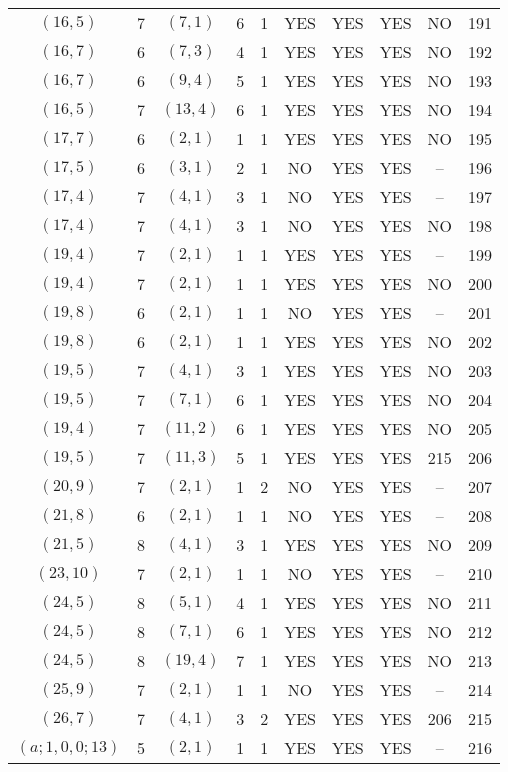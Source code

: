 \begin{longtable}{|c|c|c|c|c|c|c|c|c|c|}
$(16, 5)$ & 7 & $(7, 1)$ & 6 & 1 & YES & YES & YES & NO & 191\\
$(16, 7)$ & 6 & $(7, 3)$ & 4 & 1 & YES & YES & YES & NO & 192\\
$(16, 7)$ & 6 & $(9, 4)$ & 5 & 1 & YES & YES & YES & NO & 193\\
$(16, 5)$ & 7 & $(13, 4)$ & 6 & 1 & YES & YES & YES & NO & 194\\
$(17, 7)$ & 6 & $(2, 1)$ & 1 & 1 & YES & YES & YES & NO & 195\\
$(17, 5)$ & 6 & $(3, 1)$ & 2 & 1 & NO & YES & YES & -- & 196\\
$(17, 4)$ & 7 & $(4, 1)$ & 3 & 1 & NO & YES & YES & -- & 197\\
$(17, 4)$ & 7 & $(4, 1)$ & 3 & 1 & NO & YES & YES & NO & 198\\
$(19, 4)$ & 7 & $(2, 1)$ & 1 & 1 & YES & YES & YES & -- & 199\\
$(19, 4)$ & 7 & $(2, 1)$ & 1 & 1 & YES & YES & YES & NO & 200\\
$(19, 8)$ & 6 & $(2, 1)$ & 1 & 1 & NO & YES & YES & -- & 201\\
$(19, 8)$ & 6 & $(2, 1)$ & 1 & 1 & YES & YES & YES & NO & 202\\
$(19, 5)$ & 7 & $(4, 1)$ & 3 & 1 & YES & YES & YES & NO & 203\\
$(19, 5)$ & 7 & $(7, 1)$ & 6 & 1 & YES & YES & YES & NO & 204\\
$(19, 4)$ & 7 & $(11, 2)$ & 6 & 1 & YES & YES & YES & NO & 205\\
$(19, 5)$ & 7 & $(11, 3)$ & 5 & 1 & YES & YES & YES & 215 & 206\\
$(20, 9)$ & 7 & $(2, 1)$ & 1 & 2 & NO & YES & YES & -- & 207\\
$(21, 8)$ & 6 & $(2, 1)$ & 1 & 1 & NO & YES & YES & -- & 208\\
$(21, 5)$ & 8 & $(4, 1)$ & 3 & 1 & YES & YES & YES & NO & 209\\
$(23, 10)$ & 7 & $(2, 1)$ & 1 & 1 & NO & YES & YES & -- & 210\\
$(24, 5)$ & 8 & $(5, 1)$ & 4 & 1 & YES & YES & YES & NO & 211\\
$(24, 5)$ & 8 & $(7, 1)$ & 6 & 1 & YES & YES & YES & NO & 212\\
$(24, 5)$ & 8 & $(19, 4)$ & 7 & 1 & YES & YES & YES & NO & 213\\
$(25, 9)$ & 7 & $(2, 1)$ & 1 & 1 & NO & YES & YES & -- & 214\\
$(26, 7)$ & 7 & $(4, 1)$ & 3 & 2 & YES & YES & YES & 206 & 215\\
$(a; 1, 0, 0; 13)$ & 5 & $(2, 1)$ & 1 & 1 & YES & YES & YES & -- & 216\\

\end{longtable}
